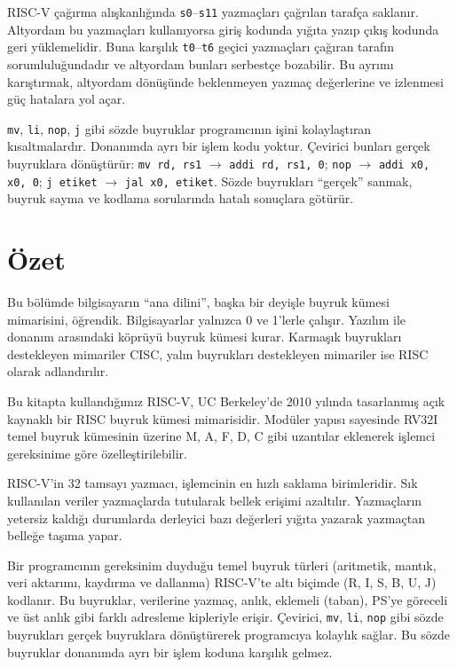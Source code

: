 RISC-V çağırma alışkanlığında \texttt{s0}--\texttt{s11} yazmaçları çağrılan tarafça saklanır. Altyordam bu yazmaçları kullanıyorsa giriş kodunda yığıta yazıp çıkış kodunda geri yüklemelidir. Buna karşılık \texttt{t0}--\texttt{t6} geçici yazmaçları çağıran tarafın sorumluluğundadır ve altyordam bunları serbestçe bozabilir. Bu ayrımı karıştırmak, altyordam dönüşünde beklenmeyen yazmaç değerlerine ve izlenmesi güç hatalara yol açar.

\texttt{mv}, \texttt{li}, \texttt{nop}, \texttt{j} gibi sözde buyruklar programcının işini kolaylaştıran kısaltmalardır. Donanımda ayrı bir işlem kodu yoktur. Çevirici bunları gerçek buyruklara dönüştürür: \texttt{mv rd, rs1} $\to$ \texttt{addi rd, rs1, 0}; \texttt{nop} $\to$ \texttt{addi x0, x0, 0}; \texttt{j etiket} $\to$ \texttt{jal x0, etiket}. Sözde buyrukları ``gerçek'' sanmak, buyruk sayma ve kodlama sorularında hatalı sonuçlara götürür.


\section{Özet}
\label{sec:bolum3-ozet}

Bu bölümde bilgisayarın ``ana dilini'', başka bir deyişle buyruk kümesi mimarisini, öğrendik. Bilgisayarlar yalnızca 0 ve 1'lerle çalışır. Yazılım ile donanım arasındaki köprüyü buyruk kümesi kurar. Karmaşık buyrukları destekleyen mimariler CISC, yalın buyrukları destekleyen mimariler ise RISC olarak adlandırılır.

Bu kitapta kullandığımız RISC-V, UC Berkeley'de 2010 yılında tasarlanmış açık kaynaklı bir RISC buyruk kümesi mimarisidir. Modüler yapısı sayesinde RV32I temel buyruk kümesinin üzerine M, A, F, D, C gibi uzantılar eklenerek işlemci gereksinime göre özelleştirilebilir.

RISC-V'in 32 tamsayı yazmacı, işlemcinin en hızlı saklama birimleridir. Sık kullanılan veriler yazmaçlarda tutularak bellek erişimi azaltılır. Yazmaçların yetersiz kaldığı durumlarda derleyici bazı değerleri yığıta yazarak yazmaçtan belleğe taşıma yapar.

Bir programcının gereksinim duyduğu temel buyruk türleri (aritmetik, mantık, veri aktarımı, kaydırma ve dallanma) RISC-V'te altı biçimde (R, I, S, B, U, J) kodlanır. Bu buyruklar, verilerine yazmaç, anlık, eklemeli (taban), PS'ye göreceli ve üst anlık gibi farklı adresleme kipleriyle erişir. Çevirici, \texttt{mv}, \texttt{li}, \texttt{nop} gibi sözde buyrukları gerçek buyruklara dönüştürerek programcıya kolaylık sağlar. Bu sözde buyruklar donanımda ayrı bir işlem koduna karşılık gelmez.


